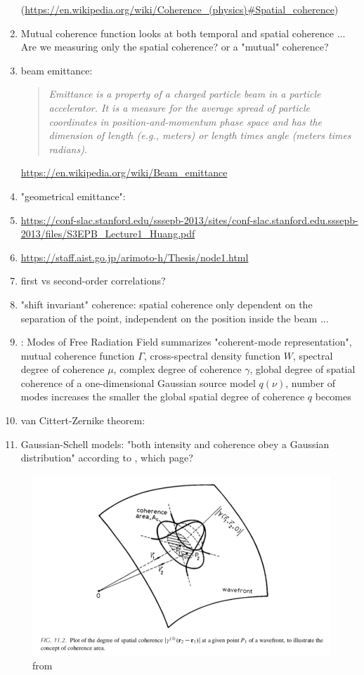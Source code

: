 \documentclass{article}
\newenvironment{itquote}
{\begin{quote}\itshape}
	{\end{quote}}
\begin{document}
\begin{enumerate}
\begin{itquote}
	\end{itquote} (\url{https://en.wikipedia.org/wiki/Coherence_(physics)#Spatial_coherence})
	\item Mutual coherence function looks at both temporal and spatial coherence ... Are we measuring only the spatial coherence? or a "mutual" coherence?
	\item beam emittance:
	\begin{itquote}
		Emittance is a property of a charged particle beam in a particle accelerator. It is a measure for the average spread of particle coordinates in position-and-momentum phase space and has the dimension of length (e.g., meters) or length times angle (meters times radians).
	\end{itquote}
	\url{https://en.wikipedia.org/wiki/Beam_emittance}
	\item "geometrical emittance":
	\item \url{https://conf-slac.stanford.edu/sssepb-2013/sites/conf-slac.stanford.edu.sssepb-2013/files/S3EPB_Lecture1_Huang.pdf}
	\item \url{https://staff.aist.go.jp/arimoto-h/Thesis/node1.html}
	\item first vs second-order correlations?
	\item "shift invariant" coherence: spatial coherence only dependent on the separation of the point, independent on the position inside the beam ...
	\item \cite[p.48, ch. 3.2]{Jaegle2005-CoherentSourcesXUV}: Modes of Free Radiation Field
	summarizes \cite[ch. 4.5 and 5.5]{MandelWolf1995-Opticalcoherencequantum}
	"coherent-mode representation", mutual coherence function $ \Gamma $, cross-spectral density function $ W $, spectral degree of coherence $ \mu $, complex degree of coherence $ \gamma $, global degree of spatial coherence of a one-dimensional Gaussian source model $ q(\nu) $, number of modes increases the smaller the global spatial degree of coherence $ q $ becomes
	\item van Cittert-Zernike theorem: \cite[p.47, 129]{Jaegle2005-CoherentSourcesXUV}
	\item Gaussian-Schell models: \cite[p. 130]{Jaegle2005-CoherentSourcesXUV}
	"both intensity and coherence obey a Gaussian distribution" according to \cite{MandelWolf1995-Opticalcoherencequantum}, which page?
\end{enumerate}

\begin{figure}[h]
	\centering
\includegraphics[width=0.7\linewidth]{Svelto2010fig11p2}
	\caption{from \cite{Svelto2010}}
	\label{fig:svelto2010-fig11}
\end{figure}
\end{document}
